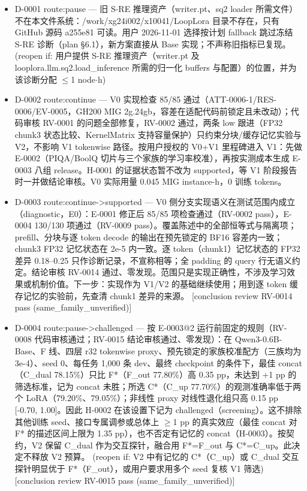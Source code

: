 \documentclass[11pt]{article}
\begin{document}
\begin{itemize}
\item D-0001 route:pause --- 旧 S-RE 推理资产（writer.pt、sq2 loader 所需文件）不在本文件系统：/work/xg24i002/x10041/LoopLora 目录不存在，只有 GitHub 源码 a255e81 可读。用户 2026-11-01 选择按计划 fallback 跳过冻结 S-RE 诊断（plan §6.1），新方案直接从 Base 实现；不声称旧指标已复现。 (reopen if: 用户提供 S-RE 推理资产（writer.pt 及 looplora.llm.sq2.load\_inference 所需的归一化 buffers 与配置）的位置，并为该诊断分配 \ensuremath{\leq}1 node\ensuremath{\cdot}h)
\item D-0002 route:continue --- V0 实现检查 85/85 通过（ATT-0006-1/RES-0006/EV-0005，GH200 MIG 2g.24gb，容差在适配代码前锁定且未改动）；代码审核 RV-0001 的问题全部修复，RV-0002 通过，两条 low 跟进（FP32 chunk3 状态比较、KernelMatrix 支持容量保护）只约束分块/缓存记忆实验与 V2，不影响 V1 tokenwise 路径。按用户授权的 V0+V1 里程碑进入 V1：先做 E-0002（PIQA/BoolQ 切片与三个家族的学习率校准），再按实测成本生成 E-0003 八组 release。H-0001 的证据状态暂不改为 supported，等 V1 阶段报告时一并做结论审核。V0 实际用量 0.045 MIG instance-h，0 训练 tokens。
\item D-0003 route:continue-\textgreater{}supported --- V0 侧分支实现语义在测试范围内成立（diagnostic，E0）：E-0001 修正后 85/85 项检查通过（RV-0002 pass），E-0004 130/130 项通过（RV-0009 pass）。覆盖陈述中的全部恒等式与隔离项；prefill、分块与逐 token decode 的输出在预先锁定的 BF16 容差内一致；chunk3 FP32 记忆状态在 2e-5 内一致。逐 token（chunk1）记忆状态的 FP32 差异 0.18--0.25 只作诊断记录，不宣称相等；全 padding 的 query 行无语义约定。结论审核 RV-0014 通过、零发现。范围只是实现正确性，不涉及学习效果或机制价值。下一步：实现作为 V1/V2 的基础继续使用；用到逐 token 缓存记忆的实验前，先查清 chunk1 差异的来源。 [conclusion review RV-0014 pass (same\_family\_unverified)]
\item D-0004 route:pause-\textgreater{}challenged --- 按 E-0003@2 运行前固定的规则（RV-0008 代码审核通过；RV-0015 结论审核通过、零发现）：在 Qwen3-0.6B-Base、F 线、四层 r32 tokenwise proxy、预先锁定的家族校准配方（三族均为 3e-4）、seed 0、每任务 1,000 条 dev、最终 checkpoint 的条件下，最佳 concat（C\_dual 78.15\%）只比 F*（F\_out 77.80\%）高 0.35 pp，未达到 +1 pp 的筛选标准，记为 concat 未胜；所选 C*（C\_up 77.70\%）的观测准确率低于两个 LoRA（79.20\%、79.05\%）；非线性 proxy 对线性退化组只高 0.15 pp [-0.70, 1.00]。因此 H-0002 在该设置下记为 challenged（screening）。这不排除其他训练 seed、接口专属调参或总体上 \ensuremath{\geq}1 pp 的真实效应（最佳 concat 对 F* 的描述区间上限为 1.35 pp），也不否定有记忆的 concat（H-0003）。按契约，V2 保留 C\_dual 作为交互探针，融合用 F*=F\_out 与 C*=C\_up。此决定不释放 V2 预算。 (reopen if: V2 中有记忆的 C*（C\_up）或 C\_dual 交互探针明显优于 F*（F\_out），或用户要求用多个 seed 复核 V1 筛选) [conclusion review RV-0015 pass (same\_family\_unverified)]

\end{itemize}
\end{document}
